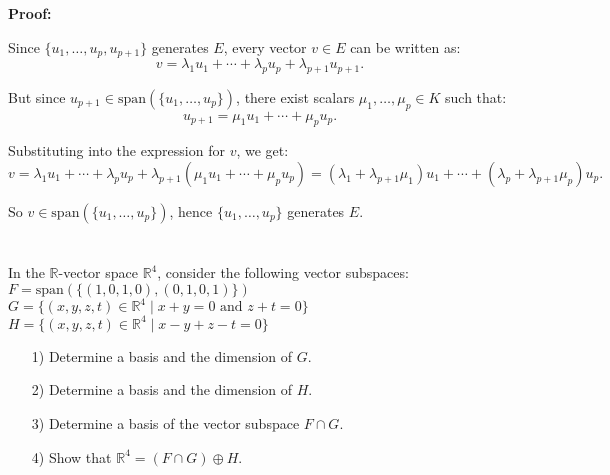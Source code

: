\documentclass[12pt]{article}
\begin{document}
\begin{answerbox}
\begin{enumerate}
    \textbf{Proof:}
    
    Since $ \{u_1, \ldots, u_p, u_{p+1}\} $ generates $ E $, every vector $ v \in E $ can be written as:
    $$
    v = \lambda_1 u_1 + \cdots + \lambda_p u_p + \lambda_{p+1} u_{p+1}.
    $$

    But since $ u_{p+1} \in \text{span}(\{u_1, \ldots, u_p\}) $, there exist scalars $ \mu_1, \ldots, \mu_p \in K $ such that:
    $$
    u_{p+1} = \mu_1 u_1 + \cdots + \mu_p u_p.
    $$

    Substituting into the expression for $ v $, we get:
    $$
    v = \lambda_1 u_1 + \cdots + \lambda_p u_p + \lambda_{p+1} (\mu_1 u_1 + \cdots + \mu_p u_p)
    = (\lambda_1 + \lambda_{p+1} \mu_1) u_1 + \cdots + (\lambda_p + \lambda_{p+1} \mu_p) u_p.
    $$

    So $ v \in \text{span}(\{u_1, \ldots, u_p\}) $, hence $ \{u_1, \ldots, u_p\} $ generates $ E $.

\end{enumerate}
\end{answerbox}

\newpage  
\section{}
In the $\mathbb{R}$-vector space $\mathbb{R}^4$, consider the following vector subspaces:\\
$F = \text{span}(\{(1,0,1,0), (0,1,0,1)\})$\\
$G = \{(x,y,z,t) \in \mathbb{R}^4 \mid x + y = 0 \text{ and } z + t = 0\}$\\
$H = \{(x,y,z,t) \in \mathbb{R}^4 \mid x - y + z - t = 0\}$

\begin{enumerate}
    \item[1)] Determine a basis and the dimension of $G$.
    \item[2)] Determine a basis and the dimension of $H$.
    \item[3)] Determine a basis of the vector subspace $F \cap G$.
    \item[4)] Show that $\mathbb{R}^4 = (F \cap G) \oplus H$.
\end{enumerate}

\newpage
\end{document}
